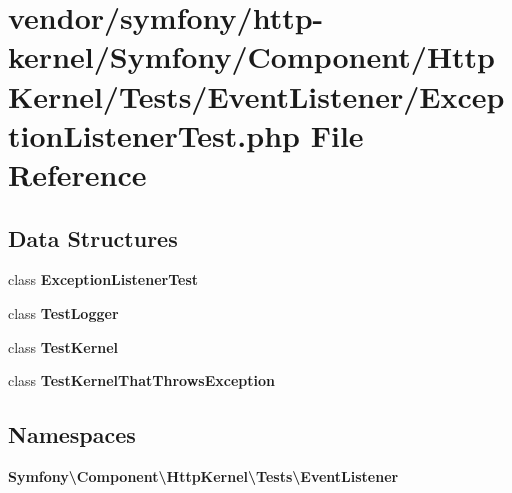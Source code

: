 \section{vendor/symfony/http-\/kernel/\+Symfony/\+Component/\+Http\+Kernel/\+Tests/\+Event\+Listener/\+Exception\+Listener\+Test.php File Reference}
\label{_exception_listener_test_8php}
\subsection*{Data Structures}
\begin{DoxyCompactItemize}
\item 
class {\bf Exception\+Listener\+Test}
\item 
class {\bf Test\+Logger}
\item 
class {\bf Test\+Kernel}
\item 
class {\bf Test\+Kernel\+That\+Throws\+Exception}
\end{DoxyCompactItemize}
\subsection*{Namespaces}
\begin{DoxyCompactItemize}
\item 
 {\bf Symfony\textbackslash{}\+Component\textbackslash{}\+Http\+Kernel\textbackslash{}\+Tests\textbackslash{}\+Event\+Listener}
\end{DoxyCompactItemize}
